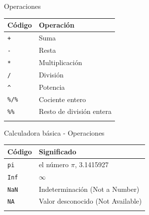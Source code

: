 \documentclass[
  ignorenonframetext,
  aspectratio=169]{beamer}
\begin{document}
\begin{frame}[fragile]{Operaciones}
\label{operaciones}
\begin{longtable}[]{@{}ll@{}}
\toprule\noalign{}
Código & Operación \\
\midrule\noalign{}
\endhead
\texttt{+} & Suma \\
\texttt{-} & Resta \\
\texttt{*} & Multiplicación \\
\texttt{/} & División \\
\texttt{\^{}} & Potencia \\
\texttt{\%/\%} & Cociente entero \\
\texttt{\%\%} & Resto de división entera \\
\bottomrule\noalign{}
\end{longtable}

\begin{block}{Calculadora básica - Operaciones}
\label{calculadora-buxe1sica---operaciones}
\begin{longtable}[]{@{}ll@{}}
\toprule\noalign{}
Código & Significado \\
\midrule\noalign{}
\endhead
\texttt{pi} & el número \(\pi\), 3.1415927 \\
\texttt{Inf} &
\href{https://es.wikipedia.org/wiki/Infinito}{\(\infty\)} \\
\texttt{NaN} & Indeterminación (Not a Number) \\
\texttt{NA} & Valor desconocido (Not Available) \\
\bottomrule\noalign{}
\end{longtable}
\end{block}
\end{frame}
\end{document}
